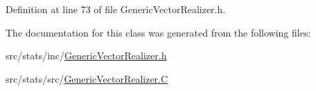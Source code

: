 Definition at line 73 of file Generic\-Vector\-Realizer.\-h.



The documentation for this class was generated from the following files\-:\begin{DoxyCompactItemize}
\item 
src/stats/inc/\hyperlink{_generic_vector_realizer_8h}{Generic\-Vector\-Realizer.\-h}\item 
src/stats/src/\hyperlink{_generic_vector_realizer_8_c}{Generic\-Vector\-Realizer.\-C}\end{DoxyCompactItemize}

